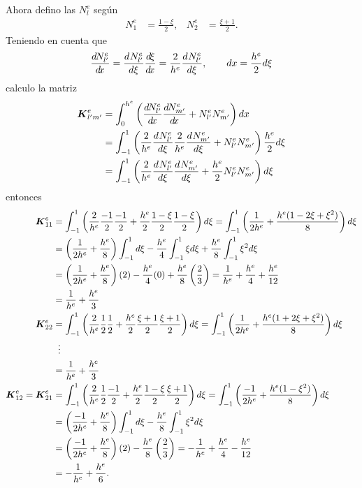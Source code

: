 \documentclass[a4paper,11pt,oneside]{article}
\begin{document}
Ahora defino las $N^e_{l}$ según
\begin{align*}
  N_1^e &= \frac{1-\xi}{2},& N_2^e &= \frac{\xi+1}{2}.
\end{align*}
Teniendo en cuenta que
\begin{align*}
  \frac{d^{}\!N_{l'}^e}{d\!x^{}}=\frac{d^{}N_{l'}^e}{d{\xi}^{}}\frac{d^{}\!\xi}{d\!x^{}}=\frac{2}{h^e}\frac{d^{}N_{l'}^e}{d{\xi}^{}},\qquad dx=\frac{h^e}{2}d\xi
\end{align*}
calculo la matriz
\begin{align*}
  \boldsymbol{K}^e_{l'm'}&=\int_0^{h^e} \left(\frac{d^{}\!N^e_{l'}}{d\!x^{}}{}\frac{d^{}\!N^e_{m'}}{d\!x^{}}+N^e_{l'}N^e_{m'}\right)dx\\
  &=\int_{-1}^{1} \left(\frac{2}{h^e}\frac{d^{}N^e_{l'}}{d{\xi}^{}}\frac{2}{h^e}\frac{d^{}N^e_{m'}}{d{\xi}^{}}+N^e_{l'}N^e_{m'}\right)\frac{h^e}{2}d\xi\\
  &=\int_{-1}^{1} \left(\frac{2}{h^e}\frac{d^{}N^e_{l'}}{d{\xi}^{}}\frac{d^{}N^e_{m'}}{d{\xi}^{}}+\frac{h^e}{2}N^e_{l'}N^e_{m'}\right)d\xi
\end{align*}
entonces
\begin{align*}
\B{K}^e_{11}&=\int_{-1}^{1} \left(\frac{2}{h^e}\frac{-1}{2}\frac{-1}{2}+\frac{h^e}{2}\frac{1-\xi}{2}\frac{1-\xi}{2}\right)d\xi=\int_{-1}^{1} \left(\frac{1}{2h^e}+\frac{h^e(1-2\xi+\xi^2)}{8}\right)d\xi\\
&=\left(\frac{1}{2h^e}+\frac{h^e}{8}\right)\int_{-1}^{1}d\xi
- \frac{h^e}{4}\int_{-1}^{1}\xi d\xi + \frac{h^e}{8} \int_{-1}^{1}\xi^2 d\xi\\
&=\left(\frac{1}{2h^e}+\frac{h^e}{8}\right) (2)
- \frac{h^e}{4}(0) + \frac{h^e}{8}\left( \frac{2}{3}\right)=\frac{1}{h^e}+\frac{h^e}{4}
+ \frac{h^e}{12}\\%
&=\frac{1}{h^e}
+ \frac{h^e}{3}\\
\B{K}^e_{22}&=\int_{-1}^{1} \left(\frac{2}{h^e}\frac{1}{2}\frac{1}{2}+\frac{h^e}{2}\frac{\xi+1}{2}\frac{\xi+1}{2}\right)d\xi=\int_{-1}^{1} \left(\frac{1}{2h^e}+\frac{h^e(1+2\xi+\xi^2)}{8}\right)d\xi\\
&\;\;\vdots\\
&=\frac{1}{h^e}+ \frac{h^e}{3}\\
\B{K}^e_{12}=\B{K}^e_{21}&=\int_{-1}^{1} \left(\frac{2}{h^e}\frac{1}{2}\frac{-1}{2}+\frac{h^e}{2}\frac{1-\xi}{2}\frac{\xi+1}{2}\right)d\xi
=\int_{-1}^{1} \left(\frac{-1}{2h^e}+\frac{h^e(1-\xi^2)}{8}\right)d\xi\\
&=\left(\frac{-1}{2h^e}+\frac{h^e}{8}\right)\int_{-1}^{1}d\xi-\frac{h^e}{8}\int_{-1}^{1}\xi^2d\xi\\
&=\left(\frac{-1}{2h^e}+\frac{h^e}{8}\right)(2)-\frac{h^e}{8}\left(\frac{2}{3}\right)=-\frac{1}{h^e}+\frac{h^e}{4}-\frac{h^e}{12}\\
&=-\frac{1}{h^e}+\frac{h^e}{6}.
\end{align*}
%
%
\end{document}
